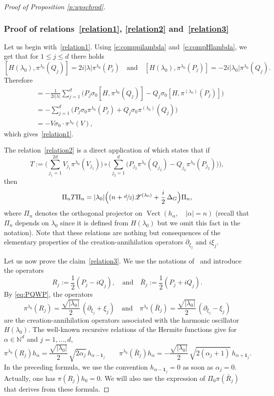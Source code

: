 \documentclass[10pt]{amsart}
\let\mathcal\mathscr
\newcommand{\bun}{\mathbf{1}}
\DeclareMathOperator{\Vect}{Vect}
\theoremstyle{plain}
\theoremstyle{definition}
\def\N{{\mathbb N}}
\begin{document}
\begin{proof}[Proof of Proposition \ref{p:wpschrod}]
\subsubsection*{Proof of relations~\eqref{relation1}, \eqref{relation2} and~\eqref{relation3}}
Let us begin with~\eqref{relation1}. Using \eqref{e:comppilambda} and~\eqref{e:compHlambda}, we get that for $1\leq j\leq d$ there holds
\[
[H(\lambda_0), \pi^{\lambda_0}(Q_j) ]= 2i|\lambda|\pi^{\lambda_0}(P_j)\quad \mbox{and}\quad
[H(\lambda_0), \pi^{\lambda_0}(P_j) ]= -2i|\lambda_0|\pi^{\lambda_0}(Q_j).
\]
Therefore
\begin{align*}
[H(\lambda_0), \theta_0] &= - \frac 1{2i|\lambda|} \sum_{j=1}^d \bigl(P_j \sigma_0 [H, \pi^{\lambda_0}(Q_j)]-Q_j\sigma_0 [H, \pi^{(\lambda_0)}(P_j)]\bigr)\\
&= - \sum_{j=1}^{d} \bigl(P_j \sigma_0\pi^{\lambda_0}(P_j)+Q_j \sigma_0 \pi^{(\lambda_0)}(Q_j)\bigr)\\
&= - V\sigma_0\cdot \pi^{\lambda_0}(V),
\end{align*}
which gives~\eqref{relation1}.

The relation~\eqref{relation2} is a direct application of \cite[Lem.\,B.2]{FF} which states that if
\[
T:=
\biggl(\sum_{j_1=1}^{2d}
V_{j_1} \pi^{\lambda_0} (V_{j_1})\biggr)\circ
\biggl(\sum_{j_2=1}^d
\bigl(P_{j_2} \pi^{\lambda_0} (Q_{j_2}) - Q_{j_2} \pi^{\lambda_0}(P_{j_2})\bigr)\biggr),
\]
then
\begin{equation*}\label{eq:PinTPin}
\Pi_n T \Pi_n =
|\lambda_0|
\Bigl((n+\sfrac d2) {\mathcal Z}^{(\lambda_0)}
+\frac i 2\, \Delta_G\Bigr) \Pi_n,
\end{equation*}
where $\Pi_n$ denotes the orthogonal projector on $\Vect(h_\alpha,\quad |\alpha|=n)$ (recall that $\Pi_n$ depends on $\lambda_0$ since it is defined from $H(\lambda_0)$ but we omit this fact in the notation).
Note that these relations are nothing but consequences of the elementary properties of the creation-annihilation operators $\partial_{\xi_j}$ and $i\xi_j$.

Let us now prove the claim~\eqref{relation3}. We use the notations of~\cite{FF} and introduce the operators
\[
R_j := \frac12 (P_j - iQ_j),
\quad\mbox{and}\quad
\bar R_j := \frac12 (P_j + iQ_j).
\]
By \eqref{eq:PQWP}, the operators
\[
\pi^{\lambda_0} (R_j)=\frac{\sqrt{|\lambda_0|}}2 \,(\partial_{\xi_j} +\xi_j)\quad\text{and}\quad
\pi^{\lambda_0} (\bar R_j)=\frac{\sqrt{|\lambda_0|}}2 \,(\partial_{\xi_j} -\xi_j)
\]
are the creation-annihilation operators associated with the harmonic oscillator $H(\lambda_0)$.
The well-known recursive relations of the Hermite functions
	give for
$\alpha\in \N^d$ and $j=1,\ldots,d$,
\[
\pi^{\lambda_0} (R_j) h_\alpha
= \frac{\sqrt{|\lambda_0|}}2\,
\sqrt{2\alpha_j}\, h_{\alpha-\bun_j}
\qquad
\pi^{\lambda_0}(\bar R_j) h_\alpha
= -\frac{\sqrt{|\lambda_0|}}2\,
\sqrt{2(\alpha_j+1)}\, h_{\alpha+\bun_j}.
\]
In the preceding formula, we use the convention $h_{\alpha-\bun_j}=0$ as soon as $\alpha_j=0$. Actually, one has $\pi(R_j) h_0=0$. We will also use the expression of $\Pi_0 \pi(\bar R_j)$ that derives from these formula.


\end{proof}
\end{document}

